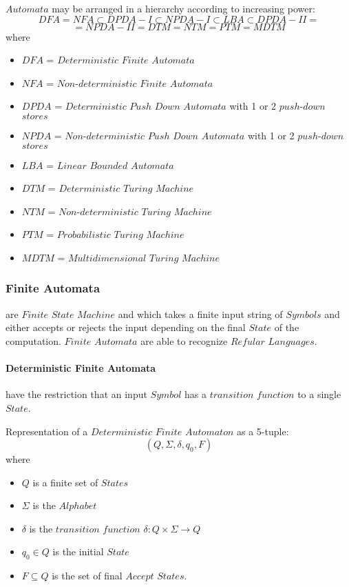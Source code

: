 \documentclass{article}
\begin{document}
$Automata$ may be arranged in a hierarchy according to increasing
power:
\[
    DFA = NFA \subset DPDA-I \subset NPDA-I \subset LBA \subset DPDA-II =
\]\[
    = NPDA-II = DTM = NTM = PTM = MDTM
\]
where
\begin{itemize}
\item $DFA$ = $Deterministic$ $Finite$ $Automata$
\item $NFA$ = $Non$-$deterministic$ $Finite$ $Automata$
\item $DPDA$ = $Deterministic$ $Push$ $Down$ $Automata$ with 1
  or 2 $push$-$down$ $stores$
\item $NPDA$ = $Non$-$deterministic$ $Push$ $Down$ $Automata$
  with 1 or 2 $push$-$down$ $stores$
\item $LBA$ = $Linear$ $Bounded$ $Automata$
\item $DTM$ = $Deterministic$ $Turing$ $Machine$
\item $NTM$ = $Non$-$deterministic$ $Turing$ $Machine$
\item $PTM$ = $Probabilistic$ $Turing$ $Machine$
\item $MDTM$ = $Multidimensional$ $Turing$ $Machine$
\end{itemize}

\subsubsection{Finite Automata} are $Finite$ $State$
$Machine$ and which takes a finite input string of $Symbols$ and
either accepts or rejects the input depending on the final $State$ of
the computation. $Finite$ $Automata$ are able to recognize $Refular$
$Languages$.

\paragraph{Deterministic Finite Automata} have the restriction
that an input $Symbol$ has a $transition$ $function$ to a single
$State$.

Representation of a $Deterministic$ $Finite$ $Automaton$ as a 5-tuple:
\[
    (Q,\Sigma,\delta,q_0,F)
\]
where
\begin{itemize}
\item $Q$ is a finite set of $States$
\item $\Sigma$ is the $Alphabet$
\item $\delta$ is the $transition$ $function$ $\delta: Q \times
  \Sigma \rightarrow Q$
\item $q_0 \in Q$ is the initial $State$
\item $F \subseteq Q$ is the set of final $Accept$ $States$.
\end{itemize}
\end{document}
